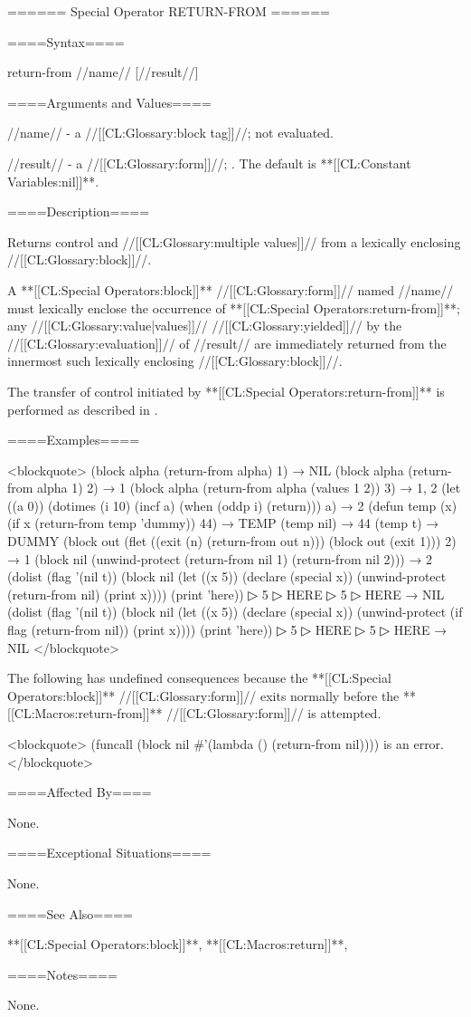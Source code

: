 ====== Special Operator RETURN-FROM ======

====Syntax====

\DefspecNoReturn return-from {//name// [//result//]}

====Arguments and Values====

//name// - a //[[CL:Glossary:block tag]]//; not evaluated.

//result// - a //[[CL:Glossary:form]]//; \eval. The default is **[[CL:Constant Variables:nil]]**.

====Description====

Returns control and //[[CL:Glossary:multiple values]]// from a lexically enclosing //[[CL:Glossary:block]]//.

A **[[CL:Special Operators:block]]** //[[CL:Glossary:form]]// named //name// must lexically enclose the occurrence of **[[CL:Special Operators:return-from]]**; any //[[CL:Glossary:value|values]]// //[[CL:Glossary:yielded]]// by the //[[CL:Glossary:evaluation]]// of //result// are immediately returned from the innermost such lexically enclosing //[[CL:Glossary:block]]//.

The transfer of control initiated by **[[CL:Special Operators:return-from]]** is performed as described in \secref\TransferOfControl.

====Examples====

<blockquote> (block alpha (return-from alpha) 1) → NIL (block alpha (return-from alpha 1) 2) → 1 (block alpha (return-from alpha (values 1 2)) 3) → 1, 2 (let ((a 0)) (dotimes (i 10) (incf a) (when (oddp i) (return))) a) → 2 (defun temp (x) (if x (return-from temp 'dummy)) 44) → TEMP (temp nil) → 44 (temp t) → DUMMY (block out (flet ((exit (n) (return-from out n))) (block out (exit 1))) 2) → 1 (block nil (unwind-protect (return-from nil 1) (return-from nil 2))) → 2 (dolist (flag '(nil t)) (block nil (let ((x 5)) (declare (special x)) (unwind-protect (return-from nil) (print x)))) (print 'here))
▷ 5
▷ HERE
▷ 5
▷ HERE → NIL (dolist (flag '(nil t)) (block nil (let ((x 5)) (declare (special x)) (unwind-protect (if flag (return-from nil)) (print x)))) (print 'here))
▷ 5
▷ HERE
▷ 5
▷ HERE → NIL </blockquote>

The following has undefined consequences because the **[[CL:Special Operators:block]]** //[[CL:Glossary:form]]// exits normally before the **[[CL:Macros:return-from]]** //[[CL:Glossary:form]]// is attempted.

<blockquote> (funcall (block nil #'(lambda () (return-from nil)))) is an error. </blockquote>

====Affected By====

None.

====Exceptional Situations====

None.

====See Also====

**[[CL:Special Operators:block]]**, **[[CL:Macros:return]]**, {\secref\Evaluation}

====Notes====

None.

